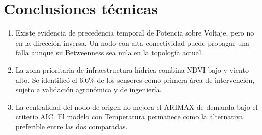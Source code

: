 \documentclass[11pt,a4paper]{article}
\begin{document}
\section{Conclusiones técnicas}

\begin{enumerate}
    \item Existe evidencia de precedencia temporal de Potencia sobre Voltaje, pero no en la dirección inversa. Un nodo con alta conectividad puede propagar una falla aunque su Betweenness sea nula en la topología actual.
    \item La zona prioritaria de infraestructura hídrica combina NDVI bajo y viento alto. Se identificó el 6.6\% de los sensores como primera área de intervención, sujeto a validación agronómica y de ingeniería.
    \item La centralidad del nodo de origen no mejora el ARIMAX de demanda bajo el criterio AIC. El modelo con Temperatura permanece como la alternativa preferible entre las dos comparadas.
\end{enumerate}
\end{document}
